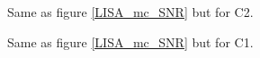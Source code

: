 \documentclass{iopart}
\begin{document}
\begin{figure}
\caption{Same as figure \ref{LISA_mc_SNR} but for C2.
\label{C2_mc_SNR} } 
\end{figure}


\begin{figure}
\caption{Same as figure \ref{LISA_mc_SNR} but for C1.
\label{C1_mc_SNR} } 
\end{figure}
\end{document}
